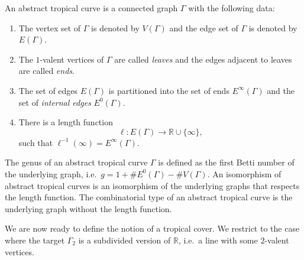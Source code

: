 \begin{defi}
An abstract tropical curve is a connected graph $\Gamma$ with the following data:
\begin{enumerate}
    \item The vertex set of $\Gamma$ is denoted by $V(\Gamma)$ and the edge set of $\Gamma$ is denoted by $E(\Gamma)$.
    \item The $1$-valent vertices of $\Gamma$ are called \textit{leaves} and the edges adjacent to leaves are called \textit{ends}.
    \item The set of edges $E(\Gamma)$ is partitioned into the set of ends $E^\infty(\Gamma)$ and the set of \textit{internal edges} $E^0(\Gamma)$.
    \item There is a length function
    \begin{equation*}
        \ell\colon E(\Gamma)\to\mathbb{R}\cup\{\infty\},
    \end{equation*}
    such that $\ell^{-1}(\infty)=E^\infty(\Gamma)$.
\end{enumerate}
The genus of an abstract tropical curve $\Gamma$ is defined as the first Betti number of the underlying graph, i.e.\ $g=1+\# E^0(\Gamma)-\# V(\Gamma)$. An isomorphism of abstract tropical curves is an isomorphism of the underlying graphs that respects the length function. The combinatorial type of an abstract tropical curve is the underlying graph without the length function.
\end{defi}

We are now ready to define the notion of a tropical cover. We restrict to the case where the target $\Gamma_2$ is a subdivided version of $\mathbb{R}$, i.e.\ a line with some $2$-valent vertices.

